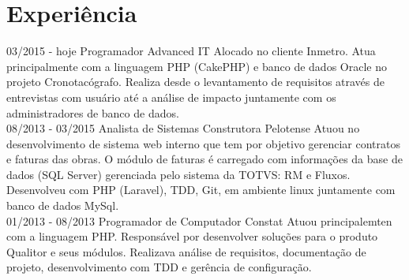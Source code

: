 \documentclass[]{friggeri-cv}
\begin{document}
\section{Experiência}
\begin{entrylist}
  \entry
    {03/2015 - hoje}
    {Programador}
    {Advanced IT}
    {Alocado no cliente Inmetro. Atua principalmente com a linguagem PHP (CakePHP) e banco de dados Oracle no projeto Cronotacógrafo. Realiza desde o levantamento de requisitos através de entrevistas com usuário até a análise de impacto juntamente com os administradores de banco de dados.\\}
  \entry
    {08/2013 - 03/2015}
    {Analista de Sistemas}
    {Construtora Pelotense}
    {Atuou no desenvolvimento de sistema web interno que tem por objetivo gerenciar contratos e faturas das obras. O módulo de faturas é carregado com informações da base de dados (SQL Server) gerenciada pelo sistema da TOTVS: RM e Fluxos. Desenvolveu com PHP (Laravel), TDD, Git, em ambiente linux juntamente com banco de dados MySql.\\}
    \entry
    {01/2013 - 08/2013}
    {Programador de Computador}
    {Constat}
    {Atuou principalemten com a linguagem PHP. Responsável por desenvolver soluções para o produto Qualitor e seus módulos. Realizava análise de requisitos, documentação de projeto, desenvolvimento com TDD e gerência de configuração.}
\end{entrylist}
% 
\end{document}
